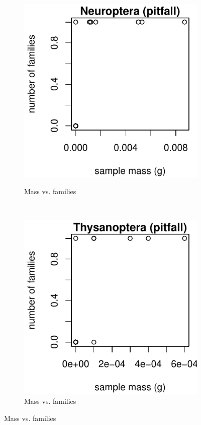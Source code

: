 \documentclass[10pt,letterpaper,twocolumn]{article}
\begin{document}
\begin{figure}[h]
\begin{subfigure}[b]{0.15\textwidth}
		\label{fig:pitfall_mantodea_scatter}
	\end{subfigure}
	~
	\begin{subfigure}[b]{0.15\textwidth}
		\caption{Mass vs. families}
		\includegraphics[width=\textwidth]{plots/mass-vs-count/scatter/2015_pitfall_Neuroptera_mass-vs-count.pdf}
		\label{fig:pitfall_neuroptera_scatter}
	\end{subfigure}
	~
	\begin{subfigure}[b]{0.15\textwidth}
		\caption{Mass vs. families}
		\includegraphics[width=\textwidth]{plots/mass-vs-count/scatter/2015_pitfall_Thysanoptera_mass-vs-count.pdf}

\end{subfigure}
\end{figure}
\end{document}
